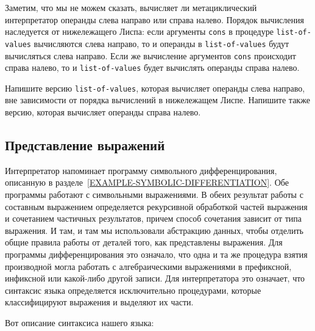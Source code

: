 \begin{exercise}{4.1}\label{EX4.1}%
%
%
Заметим, что мы не можем сказать, вычисляет ли
метациклический интерпретатор операнды слева направо или справа
налево.  Порядок вычисления наследуется от нижележащего Лиспа: если аргументы
{\tt cons} в процедуре {\tt list-of-values} вычисляются
слева направо, то и операнды в {\tt list-of-values} будут
вычисляться слева направо.  Если же вычисление аргументов {\tt cons}
происходит справа налево, то и {\tt list-of-values} будет
вычислять операнды справа налево.

Напишите версию {\tt list-of-values}, которая
вычисляет операнды слева направо, вне зависимости от порядка
вычислений в нижележащем Лиспе.  Напишите также версию, которая
вычисляет операнды справа налево.
\end{exercise}

\subsection{Представление выражений}
\label{REPRESENTING-EXPRESSIONS}%


Интерпретатор напоминает программу
символьного дифференцирования, описанную в
разделе~\ref{EXAMPLE-SYMBOLIC-DIFFERENTIATION}.  Обе программы
работают с символьными выражениями.  В обеих результат
работы с составным выражением определяется рекурсивной обработкой
частей выражения и сочетанием частичных результатов, причем способ
сочетания зависит от типа выражения.  И там, и там мы
использовали 
абстракцию данных, чтобы отделить общие 
правила работы от
деталей того, как представлены выражения.  Для программы
дифференцирования это означало, что одна и та же процедура взятия
производной могла работать с алгебраическими выражениями в префиксной,
инфиксной или какой-либо другой записи.  Для интерпретатора это
означает, что синтаксис языка определяется исключительно процедурами,
которые классифицируют выражения и выделяют их части.

Вот описание синтаксиса нашего языка:

